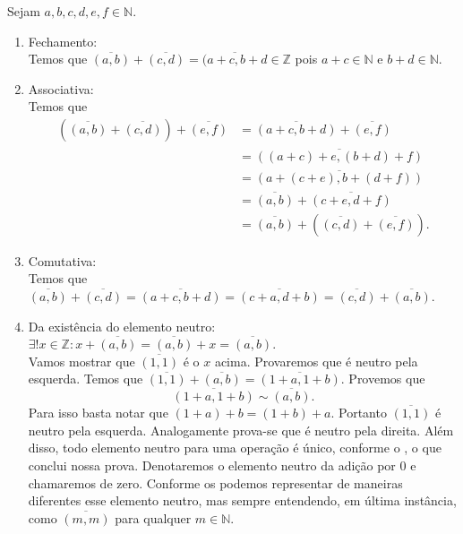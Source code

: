 \documentclass[../main.tex]{subfiles}
\begin{document}
\begin{dem}
    Sejam $a,b,c,d,e,f \in  \mathbb{N}$.
    \begin{enumerate}[label=(\roman*)]
        \item Fechamento: \\ 
        Temos que $\overline{(a,b)} + \overline{(c,d)} = \overline{(a+c,b+d} \in \mathbb{Z}$ pois  $a+c \in \mathbb{N}$ e $b+d \in \mathbb{N}$.

        \item Associativa: \\
        Temos que
        \begin{align*}
            \left(\overline{(a,b)} + \overline{(c,d)}\right) +  \overline{(e,f)} 
            &= \overline{(a+c,b+d)}+\overline{(e,f)} \\ 
            &= \overline{((a+c)+e, (b+d)+f)} \\
            &= \overline{ \left( a+(c+e), b+(d+f) \right) } \\
            &= \overline{(a,b)} + \overline{ (c+e, d+f) } \\
            &= \overline{(a,b)} + \left( \overline{(c,d)} + \overline{(e,f)} \right).
        \end{align*}
       
        \item Comutativa: \\
        Temos que
        $\overline{(a,b)} + \overline{(c,d)} = \overline{(a+c,b+d)} = \overline{(c+a,d+b)} = \overline{(c,d)} + \overline{(a,b)}$.
       
        \item Da existência do elemento neutro: $\exists! x \in \mathbb{Z} : x + \overline{(a,b)} = \overline{(a,b)} + x = \overline{(a,b)}$. \\
        Vamos mostrar que $\overline{(1,1)}$ é o $x$ acima. 
        Provaremos que é neutro pela esquerda. Temos que $\overline{(1,1)} + \overline{(a,b)} = \overline{(1+a,1+b)}$. Provemos que   \[\overline{(1+a,1+b)} \sim \overline{(a,b)}. \]
        Para isso basta notar que $(1+a)+b = (1+b)+a$. Portanto $\overline{(1,1)}$ é neutro pela esquerda. Analogamente prova-se que é neutro pela direita. Além disso, todo elemento neutro para uma operação é único, conforme o , o que conclui nossa prova. Denotaremos o elemento neutro da adição por $0$ e chamaremos de zero. Conforme os  podemos representar de maneiras diferentes esse elemento neutro, mas sempre entendendo, em última instância, como $\overline{(m,m)}$ para qualquer $m \in \mathbb{N}$.
       

\end{enumerate}
\end{dem}
\end{document}
